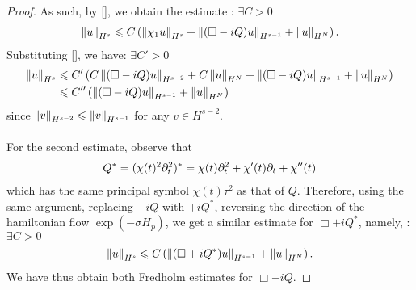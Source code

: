 \documentclass[12pt]{article}
\begin{document}
\begin{proof}
     As such, by \ref{}, we obtain the estimate : $\exists C > 0$
     \begin{align*}
     \norm[u]_{H^s} \leq C \brac{\norm[\chi_1 u]_{H^s} +  \norm[(\Box - iQ) u]_{H^{s - 1}} + \norm[u]_{H^N} }. 
     \end{align*}
     Substituting \ref{}, we have: $\exists C' > 0$
     \begin{align*}
      \norm[u]_{H^s} 
      & \leq C' \brac{C \norm[(\Box - iQ)u ]_{H^{s - 2}} + C \norm[u]_{H^N} +  \norm[(\Box - iQ) u]_{H^{s - 1}} + \norm[u]_{H^N} } \\
      & \leq C'' \brac{ \norm[(\Box - iQ) u]_{H^{s - 1}} + \norm[u]_{H^N} }
     \end{align*}
     since $\norm[v]_{H^{s - 2}} \leq \norm[v]_{H^{s - 1}}$ for any $v \in H^{s - 2}$. \\
     \\
     For the second estimate, observe that 
     \begin{align*}
     Q^* = (\chi(t)^2 \p_t^2)^* = \chi(t) \p_t^2 + \chi'(t)\p_t + \chi''(t)
     \end{align*}
     which has the same principal symbol $\chi(t) \tau^2$ as that of $Q$. Therefore, using the same argument, replacing $-iQ$ with $+iQ^*$, reversing the direction of the hamiltonian flow $\exp(-\sigma H_p)$, we get a similar estimate for $\Box + i Q^*$, namely,  : $\exists C > 0$
     \begin{align*}
     \norm[u]_{H^s} \leq C \brac{ \norm[(\Box + i Q^*)u]_{H^{s - 1}} + \norm[u]_{H^N}}. 
     \end{align*}
     We have thus obtain both Fredholm estimates for $\Box - iQ$. 

\end{proof}
\end{document}
